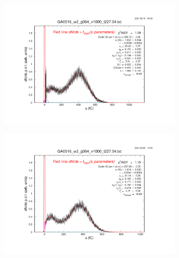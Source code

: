 \vspace{5cm}

\begin{figure}[b]
	\centering
	\begin{subfigure}[c]{0.42\linewidth}
		\centering
		\includegraphics[width=\linewidth, trim={6cm 6cm 75mm 85mm},clip]{figures/pavel_temp/GA0516_w2_g064_v1000_3mm.04.png}
		\vspace{0mm}
	\end{subfigure}%
	\begin{subfigure}[c]{0.42\linewidth}
		\centering
		\includegraphics[width=\linewidth, trim={75mm 6cm 6cm 85mm},clip]{figures/pavel_temp/GA0516_w3_g064_v1000_cln.04.png}
		\vspace{0mm}
	\end{subfigure}%
	\vspace{0mm}

\end{figure}
